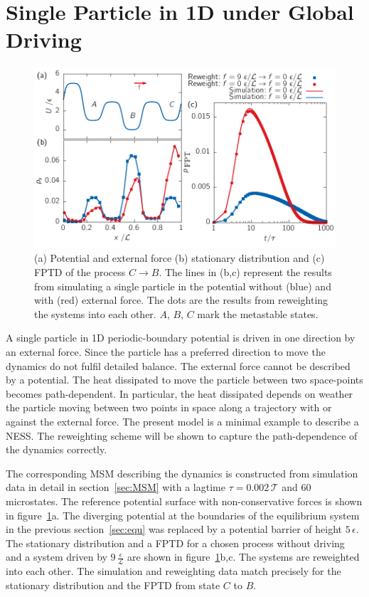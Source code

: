 \section{Single Particle in 1D under Global Driving}
\label{sec:1gl}
\begin{figure}[h]
 \centering
 \includegraphics{../plots/Urew/single_2010.pdf}
 \caption[Potential surface, stationary distribution and first-passage time distribution of a chosen process for the 1D driven system]{ (a) Potential and external force (b) stationary distribution and (c) FPTD of the process $ C \rightarrow B$. The lines in (b,c) represent the results from simulating a single particle in the potential without (blue) and with (red) external force. The dots are the results from reweighting the systems into each other. $A$, $B$, $C$ mark the metastable states. }
 \label{fig:potgl}
\end{figure}

A single particle in 1D periodic-boundary potential is driven in one direction by an external force. Since the particle has a preferred direction to move the dynamics do not fulfil detailed balance. The external force cannot be described by a potential. The heat dissipated to move the particle between two space-points becomes path-dependent. In particular, the heat  dissipated depends on weather the particle moving between two points in space along a trajectory with or against the external force. The present model is a minimal example to describe a NESS. The reweighting scheme will be shown to capture the path-dependence of the dynamics correctly.

The corresponding MSM describing the dynamics is constructed from simulation data in detail in section~\ref{sec:MSM} with a lagtime $\tau = 0.002\,\mathcal{T}$ and $60$ microstates. The reference potential surface with non-conservative forces is shown in figure~\ref{fig:potgl}a. The diverging potential at the boundaries of the equilibrium system in the previous section~\ref{sec:equ} was replaced  by a potential barrier of height $5\,\epsilon$. The stationary distribution and a FPTD for a chosen process without driving and a system driven by $9\, \frac{\epsilon}{\mathcal{L}}$ are shown in figure~\ref{fig:potgl}b,c. The systems are reweighted into each other. The simulation and reweighting data match precisely for the stationary distribution and the FPTD from state $C$ to $B$. 

